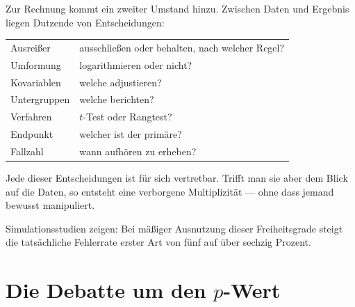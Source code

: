 \begin{warnung}
Zur Rechnung kommt ein zweiter Umstand hinzu. Zwischen Daten und Ergebnis liegen Dutzende von Entscheidungen:

\begin{center}
{\small
\renewcommand{\arraystretch}{1.48}
\begin{tabular}{@{}P{2.4cm}P{6.2cm}@{}}
\toprule
Ausreißer & ausschließen oder behalten, nach welcher Regel?\\
Umformung & logarithmieren oder nicht?\\
Kovariablen & welche adjustieren?\\
Untergruppen & welche berichten?\\
Verfahren & $t$-Test oder Rangtest?\\
Endpunkt & welcher ist der primäre?\\
Fallzahl & wann aufhören zu erheben?\\
\bottomrule
\end{tabular}}
\end{center}

\begin{center}
\begin{minipage}{0.9\textwidth}
Jede dieser Entscheidungen ist für sich vertretbar. Trifft man sie aber  dem Blick auf die Daten, so entsteht eine verborgene Multiplizität --- ohne dass jemand bewusst manipuliert.
\end{minipage}
\end{center}

Simulationsstudien zeigen: Bei mäßiger Ausnutzung dieser Freiheitsgrade steigt die tatsächliche Fehlerrate erster Art von fünf auf über sechzig Prozent.

\begin{center}
\begin{minipage}{0.88\textwidth}
\end{minipage}
\end{center}
\end{warnung}

\section{Die Debatte um den $p$-Wert}

